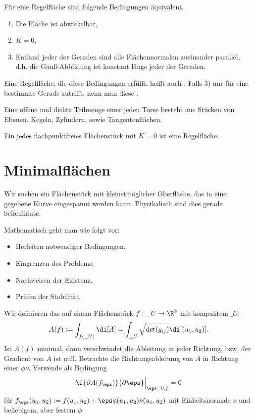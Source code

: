 \begin{st}
	Für eine Regelfläche sind folgende Bedingungen äquivalent.
	\begin{enumerate}[1)]
		\item
			Die Fläche ist abwickelbar,
		\item
			$K = 0$,
		\item
			Entland jeder der Geraden sind alle Flächennormalen zueinander parallel, d.h. die Gauß-Abbildung ist konstant längs jeder der Geraden.
	\end{enumerate}
	Eine Regelfläche, die diese Bedingungen erfüllt, heißt auch .
	Falls 3) nur für eine bestimmte Gerade zutrifft, nenn man diese .

	Eine offene und dichte Teilmenge einer jeden Torse besteht aus Stücken von Ebenen, Kegeln, Zylindern, sowie Tangentenflächen.

	Ein jedes flachpunktfreies Flächenstück mit $K = 0$ ist eine Regelfläche.
\end{st}



\section{Minimalflächen}


Wir suchen ein Flächenstück mit kleinstmöglicher Oberfläche, das in eine gegebene Kurve eingespannt werden kann.
Physikalisch sind dies gerade Seifenhäute.

Mathematisch geht man wie folgt vor:
\begin{itemize}
	\item
		Herleiten notwendiger Bedingungen,
	\item
		Eingrenzen des Problems,
	\item
		Nachweisen der Existenz,
	\item
		Prüfen der Stabilität.
\end{itemize}

Wir definieren das  auf einem Flächenstück $f: \_U \to \R^3$ mit kompaktem $\_U$:
\[
	A(f) := \int_{f(\_U)} \di[A]
	= \int_{\_U} \sqrt{\det (g_{ij})} \di[(u_1,u_2)].
\]
Ist $A(f)$ minimal, dann verschwindet die Ableitung in jeder Richtung, bzw. der Gradient von $A$ ist null.
Betrachte die Richtungsableitung von $A$ in Richtung einer  $\phi \nu$.
Verwende als Bedingung
\[
	\f{\partial A(f_\eps)}{\partial \eps} \Big|_{\eps = 0, f} = 0
\]
für $f_\eps(u_1, u_2) := f(u_1, u_2) + \eps \phi(u_1, u_2) \nu(u_1, u_2)$ mit Einheitsnormale $\nu$ und beliebigem, aber festem $\phi$.

